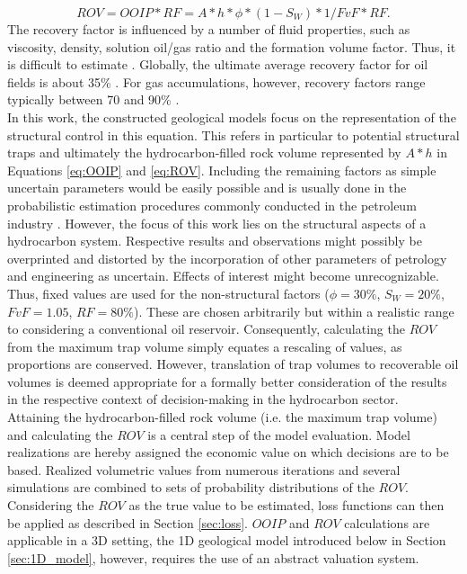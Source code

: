         \begin{equation}\label{eq:ROV}
                ROV = OOIP * RF = A * h * \phi * (1 - S_W) * 1/FvF * RF.
        \end{equation}
        The recovery factor is influenced by a number of fluid properties, such as viscosity, density, solution oil/gas ratio and the formation volume factor. Thus, it is difficult to estimate \citep{dean2007volumetric}. Globally, the ultimate average recovery factor for oil fields is about 35\% \citep{labastie2011increasingRF}. For gas accumulations, however, recovery factors range typically between 70 and 90\% \citep{dean2007volumetric}.\\
        In this work, the constructed geological models focus on the representation of the structural control in this equation. This refers in particular to potential structural traps and ultimately the hydrocarbon-filled rock volume represented by $A * h$ in Equations \ref{eq:OOIP} and \ref{eq:ROV}.
        Including the remaining factors as simple uncertain parameters would be easily possible and is usually done in the probabilistic estimation procedures commonly conducted in the petroleum industry \citep{wim2001guidelines}. However, the focus of this work lies on the structural aspects of a hydrocarbon system. Respective results and observations might possibly be overprinted and distorted by the incorporation of other parameters of petrology and engineering as uncertain. Effects of interest might become unrecognizable. Thus, fixed values are used for the non-structural factors ($\phi=30\%$, $S_W=20\%$, $FvF=1.05$, $RF = 80\%$). These are chosen arbitrarily but within a realistic range to considering a conventional oil reservoir. Consequently, calculating the $ROV$ from the maximum trap volume simply equates a rescaling of values, as proportions are conserved. However, translation of trap volumes to recoverable oil volumes is deemed appropriate for a formally better consideration of the results in the respective context of decision-making in the hydrocarbon sector.\\
        Attaining the hydrocarbon-filled rock volume (i.e. the maximum trap volume) and calculating the $ROV$ is a central step of the model evaluation. Model realizations are hereby assigned the economic value on which decisions are to be based. Realized volumetric values from numerous iterations and several simulations are combined to sets of probability distributions of the $ROV$. Considering the $ROV$ as the true value to be estimated, loss functions can then be applied as described in Section \ref{sec:loss}. $OOIP$ and $ROV$ calculations are applicable in a 3D setting, the 1D geological model introduced below in Section \ref{sec:1D_model}, however, requires the use of an abstract valuation system.
		
